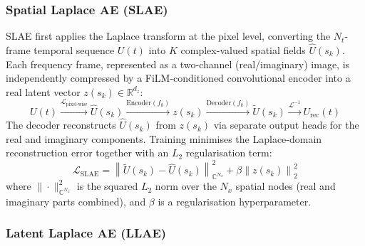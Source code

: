 ﻿\documentclass[a4paper,12pt]{article}
\theoremstyle{definition}
\theoremstyle{remark}
\newcommand{\C}{\mathbb{C}}
\newcommand{\R}{\mathbb{R}}
\begin{document}
\subsubsection{Spatial Laplace AE (SLAE)}
\label{sec:slae}

SLAE first applies the Laplace transform at the pixel level, converting the $N_t$-frame temporal sequence $U(t)$ into $K$ complex-valued spatial fields $\hat{U}(s_k)$. Each frequency frame, represented as a two-channel (real/imaginary) image, is independently compressed by a FiLM-conditioned convolutional encoder into a real latent vector $z(s_k) \in \R^{d_z}$:
\begin{equation}
    U(t) \xrightarrow{\mathcal{L}_{\text{pixel-wise}}} \hat{U}(s_k) \xrightarrow{\text{Encoder}(f_k)} z(s_k) \xrightarrow{\text{Decoder}(f_k)} \tilde{U}(s_k) \xrightarrow{\mathcal{L}^{-1}} U_{\text{rec}}(t)
\end{equation}
The decoder reconstructs $\hat{U}(s_k)$ from $z(s_k)$ via separate output heads for the real and imaginary components. Training minimises the Laplace-domain reconstruction error together with an $L_2$ regularisation term:
\begin{equation}
    \label{eq:slae_loss}
    \mathcal{L}_{\mathrm{SLAE}} = \left\| \tilde{U}(s_k) - \hat{U}(s_k) \right\|_{\C^{N_x}}^2 + \beta \left\| z(s_k) \right\|_2^2
\end{equation}
where $\| \cdot \|_{\C^{N_x}}^2$ is the squared $L_2$ norm over the $N_x$ spatial nodes (real and imaginary parts combined), and $\beta$ is a regularisation hyperparameter.

\subsubsection{Latent Laplace AE (LLAE)}
\label{sec:llae}
\end{document}
